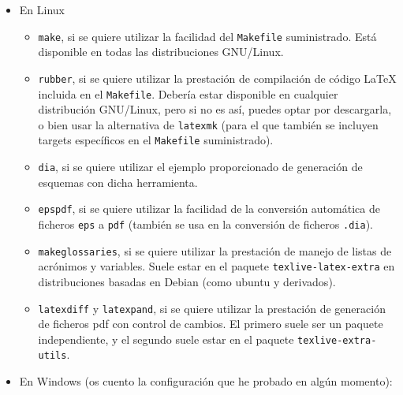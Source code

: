 \documentclass[spanish,openright]{book}
\begin{document}
\begin{itemize}
\item En Linux

  \begin{itemize}
  \item \texttt{make}, si se quiere utilizar la facilidad del
    \texttt{Makefile} suministrado. Está disponible en todas las
    distribuciones GNU/Linux.
  \item \texttt{rubber}, si se quiere utilizar la prestación de
    compilación de código \LaTeX{} incluida en el
    \texttt{Makefile}. Debería estar disponible en cualquier distribución
    GNU/Linux, pero si no es así, puedes optar por descargarla, o bien
    usar la alternativa de \texttt{latexmk} (para el que también se
    incluyen targets específicos en el \texttt{Makefile} suministrado).
  \item \texttt{dia}, si se quiere utilizar el ejemplo proporcionado de
    generación de esquemas con dicha herramienta.
  \item \texttt{epspdf}, si se quiere utilizar la facilidad de la
    conversión automática de ficheros \texttt{eps} a \texttt{pdf} (también
    se usa en la conversión de ficheros \texttt{.dia}).
  \item \texttt{makeglossaries}, si se quiere utilizar la prestación de
    manejo de listas de acrónimos y variables. Suele estar en el paquete
    \texttt{texlive-latex-extra} en distribuciones basadas en Debian
    (como ubuntu y derivados).
  \item \texttt{latexdiff} y \texttt{latexpand}, si se quiere utilizar la
    prestación de generación de ficheros pdf con control de cambios. El
    primero suele ser un paquete independiente, y el segundo suele estar
    en el paquete \texttt{texlive-extra-utils}.
  \end{itemize}

\item En Windows (os cuento la configuración que he probado en algún momento):


\end{itemize}
\end{document}

